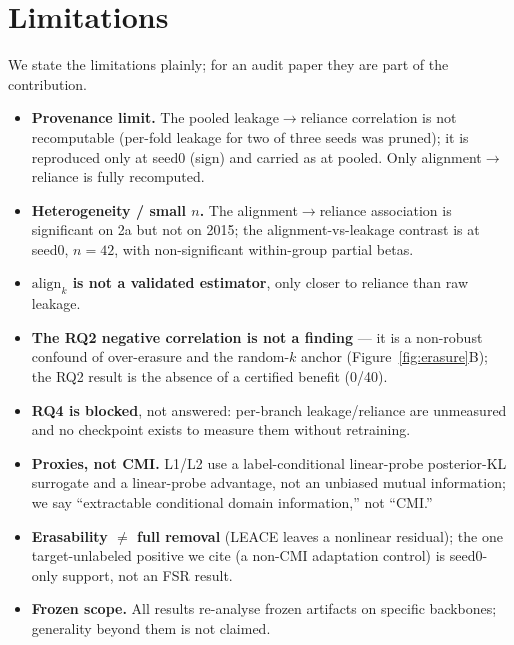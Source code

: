 \section{Limitations}
\label{sec:limitations}

We state the limitations plainly; for an audit paper they are part of the contribution.
\begin{itemize}
\item \textbf{Provenance limit.} The pooled leakage$\to$reliance correlation is not recomputable
(per-fold leakage for two of three seeds was pruned); it is reproduced only at seed0 (sign) and carried
as  at pooled. Only alignment$\to$reliance is fully recomputed.
\item \textbf{Heterogeneity / small $n$.} The alignment$\to$reliance association is significant on 2a
but not on 2015; the alignment-vs-leakage contrast is at seed0, $n{=}42$, with non-significant
within-group partial betas.
\item \textbf{$\mathrm{align}_k$ is not a validated estimator}, only closer to reliance than raw
leakage.
\item \textbf{The RQ2 negative correlation is not a finding} --- it is a non-robust confound of
over-erasure and the random-$k$ anchor (Figure~\ref{fig:erasure}B); the RQ2 result is the absence of a
certified benefit (0/40).
\item \textbf{RQ4 is blocked}, not answered: per-branch leakage/reliance are unmeasured and no
checkpoint exists to measure them without retraining.
\item \textbf{Proxies, not CMI.} L1/L2 use a label-conditional linear-probe posterior-KL surrogate and
a linear-probe advantage, not an unbiased mutual information; we say ``extractable conditional domain
information,'' not ``CMI.''
\item \textbf{Erasability $\neq$ full removal} (LEACE leaves a nonlinear residual); the one
target-unlabeled positive we cite (a non-CMI adaptation control) is seed0-only support, not an FSR
result.
\item \textbf{Frozen scope.} All results re-analyse frozen artifacts on specific backbones; generality
beyond them is not claimed.
\end{itemize}
